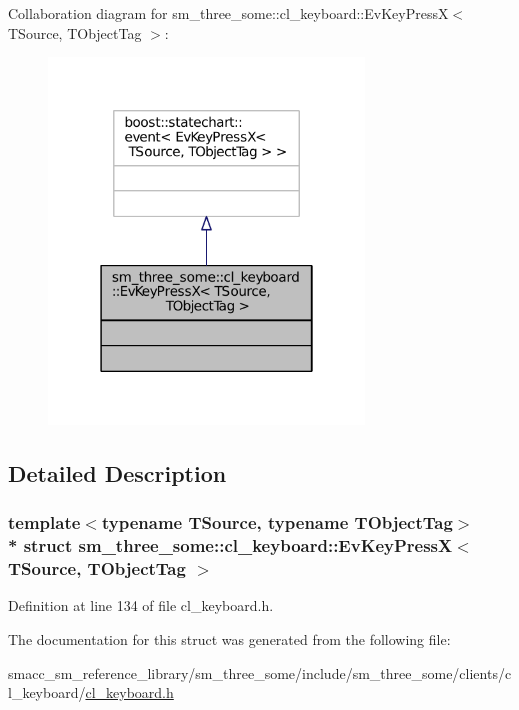 Collaboration diagram for sm\+\_\+three\+\_\+some\+:\+:cl\+\_\+keyboard\+:\+:Ev\+Key\+PressX$<$ T\+Source, T\+Object\+Tag $>$\+:
\nopagebreak
\begin{figure}[H]
\begin{center}
\leavevmode
\includegraphics[width=238pt]{structsm__three__some_1_1cl__keyboard_1_1EvKeyPressX__coll__graph}
\end{center}
\end{figure}


\subsection{Detailed Description}
\subsubsection*{template$<$typename T\+Source, typename T\+Object\+Tag$>$\\*
struct sm\+\_\+three\+\_\+some\+::cl\+\_\+keyboard\+::\+Ev\+Key\+Press\+X$<$ T\+Source, T\+Object\+Tag $>$}



Definition at line 134 of file cl\+\_\+keyboard.\+h.



The documentation for this struct was generated from the following file\+:\begin{DoxyCompactItemize}
\item 
smacc\+\_\+sm\+\_\+reference\+\_\+library/sm\+\_\+three\+\_\+some/include/sm\+\_\+three\+\_\+some/clients/cl\+\_\+keyboard/\hyperlink{cl__keyboard_8h}{cl\+\_\+keyboard.\+h}\end{DoxyCompactItemize}
